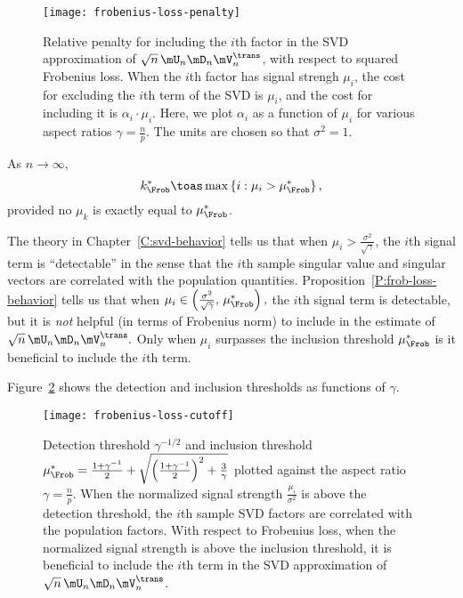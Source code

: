 \begin{figure}[tbh]
    \centering
    \texttt{[image: frobenius-loss-penalty]}
    \caption{
        Relative penalty for including the $i$th factor in the SVD 
        approximation of $\sqrt{n} \, \mU_n \mD_n \mV_n^\trans$, with
        respect to squared Frobenius loss.  When the $i$th factor
        has signal strengh $\mu_i$, the cost for excluding the $i$th term
        of the SVD is $\mu_i$, and the cost for including it is 
        $\alpha_i \cdot \mu_i$.  Here, we plot $\alpha_i$ as a function
        of $\mu_i$ for various aspect ratios $\gamma = \frac{n}{p}$.
        The units are chosen so that $\sigma^2 = 1$.
    }\label{F:frobenius-loss-penalty}
\end{figure}

\begin{corollary}
    As $n\to\infty$,
    \[
        k^\ast_\Frob
            \toas
                \max \left\{ i : \mu_i > \mu_\Frob^\ast \right\},
    \]
    provided no $\mu_k$ is exactly equal to $\mu_\Frob^\ast$.
\end{corollary}

\noindent
The theory in Chapter~\ref{C:svd-behavior} tells us that when 
$\mu_i > \frac{\sigma^2}{\sqrt{\gamma}}$, the $i$th signal term
is ``detectable'' in the sense that the $i$th sample singular value and singular vectors are correlated with the population quantities.  Proposition~\ref{P:frob-loss-behavior} tells us that when 
\(
    \mu_i 
    \in 
    \left(
        \frac{\sigma^2}{\sqrt{\gamma}}, \, 
        \mu_\Frob^\ast
    \right),
\)
the $i$th signal term is detectable, but it is \emph{not} helpful (in terms
of Frobenius norm) to include in the estimate of
\(
    \sqrt{n} \, \mU_n \mD_n \mV_n^\trans.
\)
Only when $\mu_i$ surpasses the inclusion threshold $\mu_\Frob^\ast$ is it
beneficial to include the $i$th term.

Figure~\ref{F:frobenius-loss-cutoff} shows the detection and inclusion 
thresholds as functions of $\gamma$.

\begin{figure}[hbt]
    \centering
    \texttt{[image: frobenius-loss-cutoff]}
    \caption{
        Detection threshold $\gamma^{-1/2}$ and
        inclusion threshold
        $
            \mu_\Frob^\ast
            =
            \frac{1 + \gamma^{-1}}{2}
            +
            \sqrt{
                \left( \frac{1 + \gamma^{-1} }{2} \right)^2
                +
                \frac{3}{\gamma}
            }
        $
        plotted against the aspect ratio $\gamma = \frac{n}{p}$.  When
        the normalized signal strength $\frac{\mu_i}{\sigma^2}$ is above the 
        detection threshold, the $i$th sample SVD factors are correlated with
        the population factors.  With respect to Frobenius loss, when the 
        normalized signal strength is above the inclusion threshold, it is 
        beneficial to include the $i$th term in the SVD approximation of 
        $\sqrt{n} \, \mU_n \mD_n \mV_n^\trans$.
    }\label{F:frobenius-loss-cutoff}
\end{figure}

